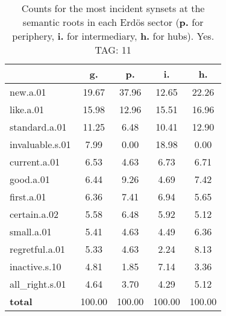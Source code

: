 \begin{table}[h!]
\begin{center}
\begin{tabular}{| l | c | c | c | c |}\hline
 & g. & p. & i. & h. \\\hline
new.a.01 & 19.67  & 37.96  & 12.65  & 22.26 \\\hline
like.a.01 & 15.98  & 12.96  & 15.51  & 16.96 \\\hline
standard.a.01 & 11.25  & 6.48  & 10.41  & 12.90 \\\hline
invaluable.s.01 & 7.99  & 0.00  & 18.98  & 0.00 \\\hline
current.a.01 & 6.53  & 4.63  & 6.73  & 6.71 \\\hline
good.a.01 & 6.44  & 9.26  & 4.69  & 7.42 \\\hline
first.a.01 & 6.36  & 7.41  & 6.94  & 5.65 \\\hline
certain.a.02 & 5.58  & 6.48  & 5.92  & 5.12 \\\hline
small.a.01 & 5.41  & 4.63  & 4.49  & 6.36 \\\hline
regretful.a.01 & 5.33  & 4.63  & 2.24  & 8.13 \\\hline
inactive.s.10 & 4.81  & 1.85  & 7.14  & 3.36 \\\hline
all\_right.s.01 & 4.64  & 3.70  & 4.29  & 5.12 \\\hline
{{\bf total}} & 100.00  & 100.00  & 100.00  & 100.00 \\\hline
\end{tabular}
\caption{Counts for the most incident synsets at the semantic roots in each Erd\"os sector ({\bf p.} for periphery, {\bf i.} for intermediary, {\bf h.} for hubs). Yes. TAG: 11}
\end{center}
\end{table}